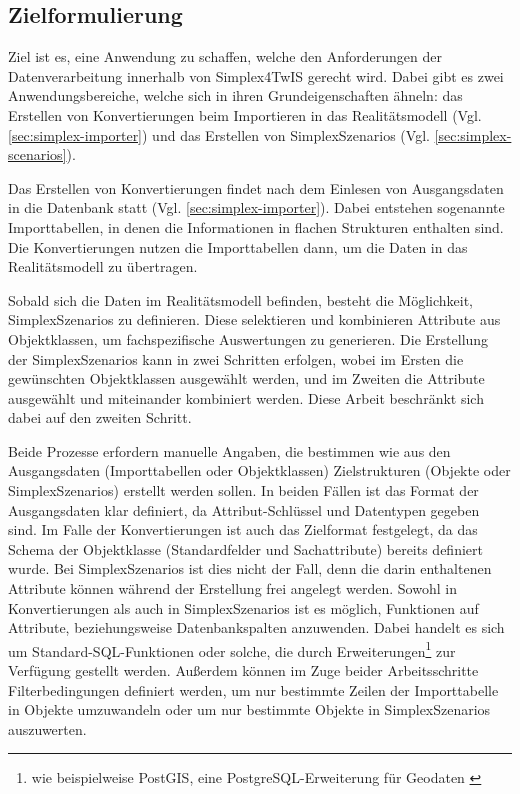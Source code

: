 \subsection{Zielformulierung}

Ziel ist es, eine Anwendung zu schaffen, welche den Anforderungen der Datenverarbeitung innerhalb von Simplex4TwIS gerecht wird. Dabei gibt es zwei Anwendungsbereiche, welche sich in ihren Grundeigenschaften ähneln: das Erstellen von Konvertierungen beim Importieren in das Realitätsmodell (Vgl. \ref{sec:simplex-importer}) und das Erstellen von SimplexSzenarios (Vgl. \ref{sec:simplex-scenarios}).

Das Erstellen von Konvertierungen findet nach dem Einlesen von Ausgangsdaten in die Datenbank statt (Vgl. \ref{sec:simplex-importer}). Dabei entstehen sogenannte Importtabellen, in denen die Informationen in flachen Strukturen enthalten sind. Die Konvertierungen nutzen die Importtabellen dann, um die Daten in das Realitätsmodell zu übertragen.

Sobald sich die Daten im Realitätsmodell befinden, besteht die Möglichkeit, SimplexSzenarios zu definieren. Diese selektieren und kombinieren Attribute aus Objektklassen, um fachspezifische Auswertungen zu generieren. Die Erstellung der SimplexSzenarios kann in zwei Schritten erfolgen, wobei im Ersten die gewünschten Objektklassen ausgewählt werden, und im Zweiten die Attribute ausgewählt und miteinander kombiniert werden. Diese Arbeit beschränkt sich dabei auf den zweiten Schritt.

Beide Prozesse erfordern manuelle Angaben, die bestimmen wie aus den Ausgangsdaten (Importtabellen oder Objektklassen) Zielstrukturen (Objekte oder SimplexSzenarios) erstellt werden sollen. In beiden Fällen ist das Format der Ausgangsdaten klar definiert, da Attribut-Schlüssel und Datentypen gegeben sind. Im Falle der Konvertierungen ist auch das Zielformat festgelegt, da das Schema der Objektklasse (Standardfelder und Sachattribute) bereits definiert wurde. Bei SimplexSzenarios ist dies nicht der Fall, denn die darin enthaltenen Attribute können während der Erstellung frei angelegt werden. Sowohl in Konvertierungen als auch in SimplexSzenarios ist es möglich, Funktionen auf Attribute, beziehungsweise Datenbankspalten anzuwenden. Dabei handelt es sich um Standard-\ac{SQL}-Funktionen oder solche, die durch Erweiterungen\footnote{wie beispielweise PostGIS, eine PostgreSQL-Erweiterung für Geodaten \parencite{postgispscPostGIS}} zur Verfügung gestellt werden. Außerdem können im Zuge beider Arbeitsschritte Filterbedingungen definiert werden, um nur bestimmte Zeilen der Importtabelle in Objekte umzuwandeln oder um nur bestimmte Objekte in SimplexSzenarios auszuwerten.

